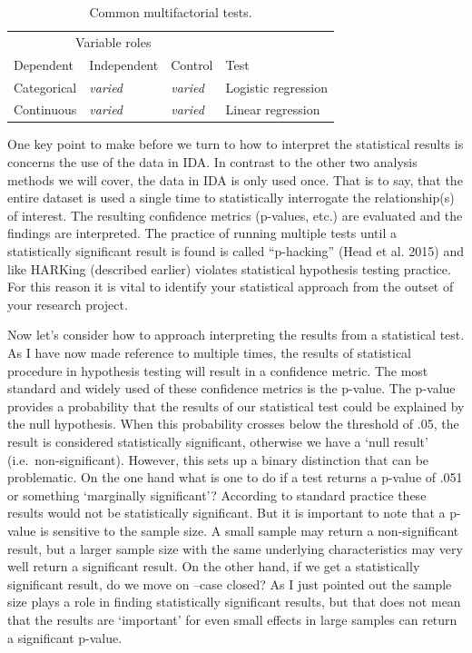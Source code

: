 \documentclass[
  letterpaper,
]{latex/krantz}
\begin{document}
\hypertarget{tbl-ida-statistical-multifactorial-listing}{}
\begin{table}
\caption{\label{tbl-ida-statistical-multifactorial-listing}Common multifactorial tests. }\tabularnewline

\centering
\begin{tabular}{l>{}l>{}ll}
\toprule
\multicolumn{3}{c}{Variable roles} & \multicolumn{1}{c}{ } \\
\cmidrule(l{3pt}r{3pt}){1-3}
Dependent & Independent & Control & Test\\
\midrule
Categorical & \em{varied} & \em{varied} & Logistic regression\\
Continuous & \em{varied} & \em{varied} & Linear regression\\
\bottomrule
\end{tabular}
\end{table}

One key point to make before we turn to how to interpret the statistical
results is concerns the use of the data in IDA. In contrast to the other
two analysis methods we will cover, the data in IDA is only used once.
That is to say, that the entire dataset is used a single time to
statistically interrogate the relationship(s) of interest. The resulting
confidence metrics (p-values, etc.) are evaluated and the findings are
interpreted. The practice of running multiple tests until a
statistically significant result is found is called ``p-hacking'' (Head
et al. 2015) and like HARKing (described earlier) violates statistical
hypothesis testing practice. For this reason it is vital to identify
your statistical approach from the outset of your research project.

Now let's consider how to approach interpreting the results from a
statistical test. As I have now made reference to multiple times, the
results of statistical procedure in hypothesis testing will result in a
confidence metric. The most standard and widely used of these confidence
metrics is the p-value. The p-value provides a probability that the
results of our statistical test could be explained by the null
hypothesis. When this probability crosses below the threshold of .05,
the result is considered statistically significant, otherwise we have a
`null result' (i.e.~non-significant). However, this sets up a binary
distinction that can be problematic. On the one hand what is one to do
if a test returns a p-value of .051 or something `marginally
significant'? According to standard practice these results would not be
statistically significant. But it is important to note that a p-value is
sensitive to the sample size. A small sample may return a
non-significant result, but a larger sample size with the same
underlying characteristics may very well return a significant result. On
the other hand, if we get a statistically significant result, do we move
on --case closed? As I just pointed out the sample size plays a role in
finding statistically significant results, but that does not mean that
the results are `important' for even small effects in large samples can
return a significant p-value.
\end{document}
